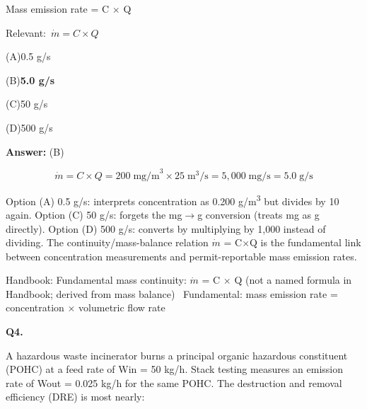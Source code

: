 \documentclass[11pt]{article}
\newcommand{\correct}[1]{\textbf{#1}\;{\color{accent}$\checkmark$}}
\newcommand{\optline}[2]{\par\noindent\hspace{1.2em}(#1)\hspace{0.6em}#2}
\begin{document}
Mass emission rate = C $\times$ Q\par\vspace{3pt}
{\small\color{soft}Relevant:}\ $\dot{m} = C \times Q$\par\vspace{3pt}
\optline{A}{0.5 g/s}
\optline{B}{\correct{5.0 g/s}}
\optline{C}{50 g/s}
\optline{D}{500 g/s}
\par\vspace{3pt}
\vspace{2pt}\par\noindent\colorbox{boxbg}{\parbox{\dimexpr\linewidth-2\fboxsep\relax}{%
\vspace{2pt}\textbf{Answer:} (B)\par\vspace{2pt}
{\small \[\dot{m} = C \times Q = 200\;\text{mg/m}^3 \times 25\;\text{m}^3\text{/s} = 5{,}000\;\text{mg/s} = 5.0\;\text{g/s}\]

Option (A) 0.5 g/s: interprets concentration as 0.200 g/m\textsuperscript{3} but divides by 10 again. Option (C) 50 g/s: forgets the mg$\rightarrow$g conversion (treats mg as g directly). Option (D) 500 g/s: converts by multiplying by 1,000 instead of dividing. The continuity/mass-balance relation $\dot{m}$ = C$\times$Q is the fundamental link between concentration measurements and permit-reportable mass emission rates.}\par\vspace{2pt}
{\footnotesize\color{soft}Handbook: Fundamental mass continuity: $\dot{m}$ = C $\times$ Q (not a named formula in Handbook; derived from mass balance) \textbullet\ Fundamental: mass emission rate = concentration $\times$ volumetric flow rate}\vspace{2pt}
}}
\vspace{9pt}
\filbreak
\textbf{\color{accent}Q4.}\par\vspace{2pt}
A hazardous waste incinerator burns a principal organic hazardous constituent (POHC) at a feed rate of Win = 50 kg/h. Stack testing measures an emission rate of Wout = 0.025 kg/h for the same POHC. The destruction and removal efficiency (DRE) is most nearly:
\end{document}

